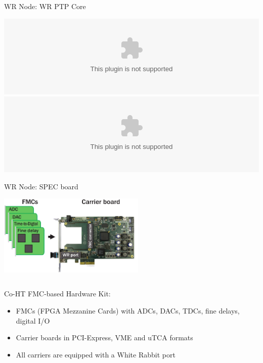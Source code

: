 \documentclass[compress,red]{beamer}
\begin{document}
\begin{frame}{WR Node: WR PTP Core}

    \begin{center}
    \includegraphics<1>[width=1.0\textwidth]{../../figures/node/wrpc_box.eps} \pause
    \includegraphics<2>[width=1.0\textwidth]{../../figures/node/wrpc_inside.eps}
    \end{center}

\end{frame}
\begin{frame}{WR Node: SPEC board}

    \begin{center}
    \includegraphics[width=7cm]{../../figures/node/shw_kit-1}
    \end{center}

  \begin{columns}[c]

	\begin{block}{Co-HT FMC-based Hardware Kit:}
	  \begin{itemize}
	  \item FMCs (FPGA Mezzanine Cards) with ADCs, DACs, TDCs, fine delays, digital I/O
	  \item Carrier boards in PCI-Express, VME and uTCA formats
	  \item All carriers are equipped with a White Rabbit port
	  \end{itemize}
	\end{block}

  \end{columns}


\end{frame}
\end{document}
